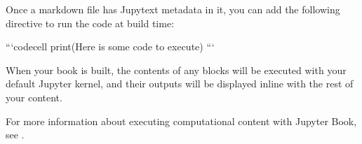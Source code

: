 \documentclass[letterpaper,10pt,english]{sphinxmanual}
\begin{document}
Once a markdown file has Jupytext metadata in it, you can add the following
directive to run the code at build time:

\begin{sphinxVerbatim}[commandchars=\\\{\}]
```\PYGZob{}code\PYGZhy{}cell\PYGZcb{}
print(\PYGZdq{}Here is some code to execute\PYGZdq{})
```
\end{sphinxVerbatim}

When your book is built, the contents of any  blocks will be
executed with your default Jupyter kernel, and their outputs will be displayed
in\sphinxhyphen{}line with the rest of your content.

For more information about executing computational content with Jupyter Book,
see .







\renewcommand{\indexname}{Index}
\printindex
\end{document}
